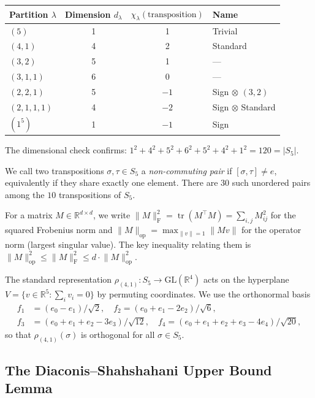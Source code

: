 \documentclass[version=final]{iacrcc}
\DeclareMathOperator{\tr}{tr}
\newcommand{\norm}[1]{\lVert #1 \rVert}
\newcommand{\frob}[1]{\norm{#1}_{\mathrm{F}}}
\newcommand{\opn}[1]{\norm{#1}_{\mathrm{op}}}
\begin{document}
\begin{center}
\begin{tabular}{lccl}
\toprule
Partition $\lambda$ & Dimension $d_\lambda$ & $\chi_\lambda(\text{transposition})$ & Name \\
\midrule
$(5)$       & 1 & 1 & Trivial \\
$(4,1)$     & 4 & 2 & Standard \\
$(3,2)$     & 5 & 1 & --- \\
$(3,1,1)$   & 6 & 0 & --- \\
$(2,2,1)$   & 5 & $-1$ & Sign $\otimes$ $(3,2)$ \\
$(2,1,1,1)$ & 4 & $-2$ & Sign $\otimes$ Standard \\
$(1^5)$     & 1 & $-1$ & Sign \\
\bottomrule
\end{tabular}
\end{center}

The dimensional check confirms: $1^2 + 4^2 + 5^2 + 6^2 + 5^2 + 4^2 + 1^2 = 120 = |S_5|$.

We call two transpositions $\sigma, \tau \in S_5$ a \emph{non-commuting pair}
if $[\sigma, \tau] \neq e$, equivalently if they share exactly one element.
There are $30$ such unordered pairs among the $10$ transpositions of $S_5$.

For a matrix $M \in \mathbb{R}^{d \times d}$, we write
$\frob{M}^2 = \tr(M^\top M) = \sum_{i,j} M_{ij}^2$ for the squared Frobenius
norm and $\opn{M} = \max_{\norm{v}=1} \norm{Mv}$ for the operator norm
(largest singular value).  The key inequality relating them is
$\opn{M}^2 \leq \frob{M}^2 \leq d \cdot \opn{M}^2$.

\begin{definition}
The standard representation $\rho_{(4,1)} : S_5 \to \mathrm{GL}(\mathbb{R}^4)$
acts on the hyperplane $V = \{v \in \mathbb{R}^5 : \sum_i v_i = 0\}$ by
permuting coordinates. We use the orthonormal basis
\begin{align*}
f_1 &= (e_0 - e_1)/\sqrt{2}, \quad
f_2 = (e_0 + e_1 - 2e_2)/\sqrt{6}, \\
f_3 &= (e_0 + e_1 + e_2 - 3e_3)/\sqrt{12}, \quad
f_4 = (e_0 + e_1 + e_2 + e_3 - 4e_4)/\sqrt{20},
\end{align*}
so that $\rho_{(4,1)}(\sigma)$ is orthogonal for all $\sigma \in S_5$.
\end{definition}


\subsection{The Diaconis--Shahshahani Upper Bound Lemma}
\end{document}
